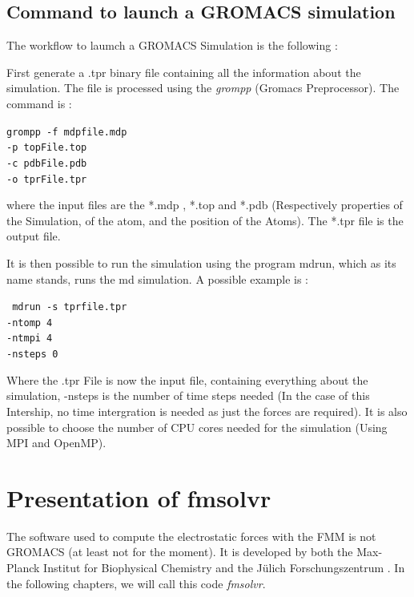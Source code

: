 \documentclass[11pt,twoside,a4paper]{report}
\begin{document}
	\subsection{Command to launch a GROMACS simulation }	
	
The workflow to laumch a GROMACS Simulation is the following : 



First generate a .tpr binary file containing all the information about the simulation. The file is processed using the \textit{grompp} (Gromacs Preprocessor). The command is :


{\centering\tt {grompp -f mdpfile.mdp \\
	 -p topFile.top \\
	 -c pdbFile.pdb \\
	 -o tprFile.tpr \\ 
 }}

\vspace{5mm}
where the input files are the *.mdp , *.top and *.pdb (Respectively properties of the Simulation, of the atom, and the position of the Atoms). The *.tpr file is the output file.

It is then possible to run the simulation using the program mdrun, which as its name stands, runs the md simulation. A possible example is :

{\centering\tt { mdrun -s tprfile.tpr \\
				 -ntomp    4  			\\		
				 -ntmpi    4				 \\
				 -nsteps 0     		  \\  
 }}
 
\vspace{5mm}

Where the .tpr File is now the input file, containing everything about the simulation, -nsteps is the number of time steps needed (In the case of this Intership, no time intergration is needed as just the forces are required). It is also possible to choose the number of CPU cores needed for the simulation (Using MPI and OpenMP).

\section{Presentation of fmsolvr}	

	The software used to compute the electrostatic forces with the FMM is not GROMACS (at least not for the moment). It is developed by both the Max-Planck Institut for Biophysical Chemistry and the Jülich Forschungszentrum . In the following chapters, we will call this code \textit{fmsolvr}. 
	
\end{document}
